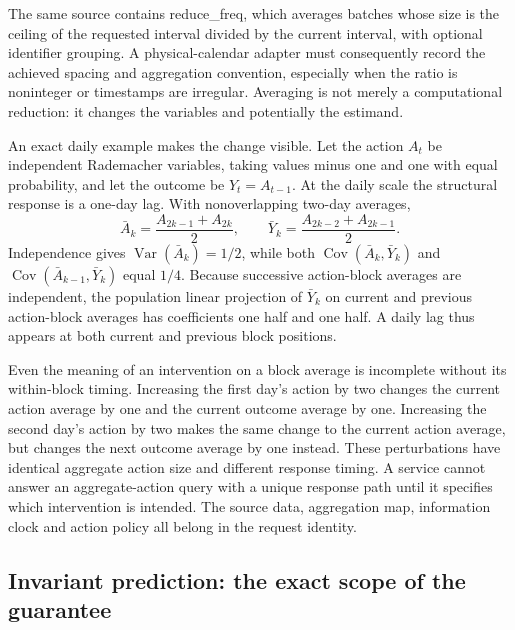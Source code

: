 The same source contains reduce\_freq, which averages batches whose size is
the ceiling of the requested interval divided by the current interval, with
optional identifier grouping. A physical-calendar adapter must consequently
record the achieved spacing and aggregation convention, especially when the
ratio is noninteger or timestamps are irregular. Averaging is not merely a
computational reduction: it changes the variables and potentially the estimand.
\citep{exec14_rtime_dbnr}

An exact daily example makes the change visible. Let the action \(A_t\) be
independent Rademacher variables, taking values minus one and one with equal
probability, and let the outcome be \(Y_t=A_{t-1}\). At the daily scale the
structural response is a one-day lag. With nonoverlapping two-day averages,
\[
 \bar A_k=\frac{A_{2k-1}+A_{2k}}2,
 \qquad
 \bar Y_k=\frac{A_{2k-2}+A_{2k-1}}2.
\]
Independence gives \(\operatorname{Var}(\bar A_k)=1/2\), while both
\(\operatorname{Cov}(\bar A_k,\bar Y_k)\) and
\(\operatorname{Cov}(\bar A_{k-1},\bar Y_k)\) equal \(1/4\).
Because successive action-block averages are independent, the population linear
projection of \(\bar Y_k\) on current and previous action-block averages has
coefficients one half and one half. A daily lag thus appears at both current
and previous block positions. \citep{exec14_rtime_exact}

Even the meaning of an intervention on a block average is incomplete without
its within-block timing. Increasing the first day's action by two changes the
current action average by one and the current outcome average by one. Increasing
the second day's action by two makes the same change to the current action
average, but changes the next outcome average by one instead. These perturbations
have identical aggregate action size and different response timing. A service
cannot answer an aggregate-action query with a unique response path until it
specifies which intervention is intended. The source data, aggregation map,
information clock and action policy all belong in the request identity.
\citep{exec14_rtime_exact}

\subsection{Invariant prediction: the exact scope of the guarantee}

